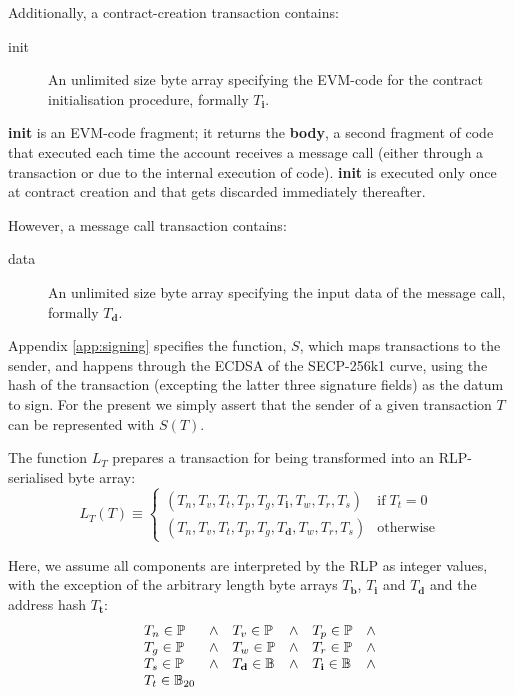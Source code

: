 \documentclass[9pt,oneside]{amsart}
\begin{document}
\begin{multicols}{2}
Additionally, a contract-creation transaction contains:

\begin{description}
\item[init] An unlimited size byte array specifying the EVM-code for the contract initialisation procedure, formally $T_\mathbf{i}$.
\end{description}

\textbf{init} is an EVM-code fragment; it returns the \textbf{body}, a second fragment of code that executed each time the account receives a message call (either through a transaction or due to the internal execution of code). \textbf{init} is executed only once at contract creation and that gets discarded immediately thereafter.

However, a message call transaction contains:

\begin{description}
\item[data] An unlimited size byte array specifying the input data of the message call, formally $T_\mathbf{d}$.
\end{description}

Appendix \ref{app:signing} specifies the function, $S$, which maps transactions to the sender, and happens through the ECDSA of the SECP-256k1 curve, using the hash of the transaction (excepting the latter three signature fields) as the datum to sign. For the present we simply assert that the sender of a given transaction $T$ can be represented with $S(T)$.

The function $L_T$ prepares a transaction for being transformed into an RLP-serialised byte array:
\begin{equation}
L_T(T) \equiv \begin{cases}
(T_n, T_v, T_t, T_p, T_g, T_\mathbf{i}, T_w, T_r, T_s) & \text{if} \; T_t = 0\\
(T_n, T_v, T_t, T_p, T_g, T_\mathbf{d}, T_w, T_r, T_s) & \text{otherwise} 
\end{cases}
\end{equation}

Here, we assume all components are interpreted by the RLP as integer values, with the exception of the arbitrary length byte arrays $T_\mathbf{b}$, $T_\mathbf{i}$ and $T_\mathbf{d}$ and the address hash $T_\mathbf{t}$:
\begin{equation}
\begin{array}[t]{lclclc}
T_n \in \mathbb{P} & \wedge & T_v \in \mathbb{P} & \wedge & T_p \in \mathbb{P} & \wedge \\
T_g \in \mathbb{P} & \wedge & T_w \in \mathbb{P} & \wedge & T_r \in \mathbb{P} & \wedge \\
T_s \in \mathbb{P} & \wedge & T_\mathbf{d} \in \mathbb{B} & \wedge & T_\mathbf{i} \in \mathbb{B} & \wedge \\
T_t \in \mathbb{B}_{20} &&&&
\end{array}
\end{equation}


\end{multicols}
\end{document}
